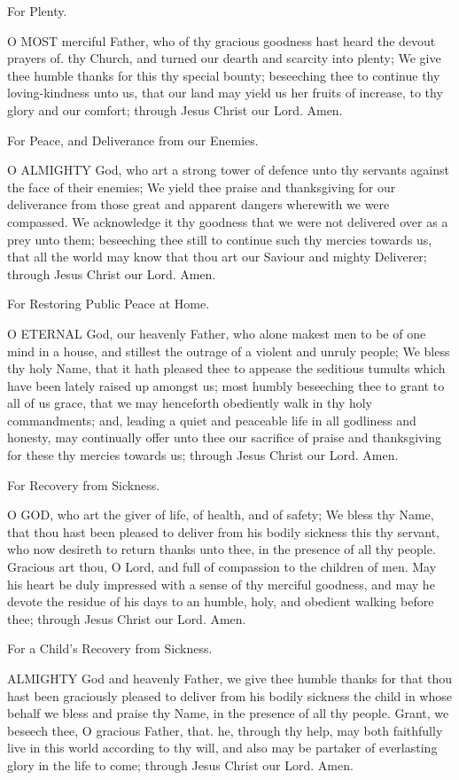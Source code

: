 For Plenty.

O MOST merciful Father, who of thy gracious goodness hast heard the devout prayers of. thy Church, and turned our dearth and scarcity into plenty; We give thee humble thanks for this thy special bounty; beseeching thee to continue thy loving-kindness unto us, that our land may yield us her fruits of increase, to thy glory and our comfort; through Jesus Christ our Lord. Amen.

For Peace, and Deliverance from our Enemies.

O ALMIGHTY God, who art a strong tower of defence unto thy servants against the face of their enemies; We yield thee praise and thanksgiving for our deliverance from those great and apparent dangers wherewith we were compassed. We acknowledge it thy goodness that we were not delivered over as a prey unto them; beseeching thee still to continue such thy mercies towards us, that all the world may know that thou art our Saviour and mighty Deliverer; through Jesus Christ our Lord. Amen.

For Restoring Public Peace at Home.

O ETERNAL God, our heavenly Father, who alone makest men to be of one mind in a house, and stillest the outrage of a violent and unruly people; We bless thy holy Name, that it hath pleased thee to appease the seditious tumults which have been lately raised up amongst us; most humbly beseeching thee to grant to all of us grace, that we may henceforth obediently walk in thy holy commandments; and, leading a quiet and peaceable life in all godliness and honesty, may continually offer unto thee our sacrifice of praise and thanksgiving for these thy mercies towards us; through Jesus Christ our Lord. Amen.

For Recovery from Sickness.

O GOD, who art the giver of life, of health, and of safety; We bless thy Name, that thou hast been pleased to deliver from his bodily sickness this thy servant, who now desireth to return thanks unto thee, in the presence of all thy people. Gracious art thou, O Lord, and full of compassion to the children of men. May his heart be duly impressed with a sense of thy merciful goodness, and may he devote the residue of his days to an humble, holy, and obedient walking before thee; through Jesus Christ our Lord. Amen.

For a Child’s Recovery from Sickness.

ALMIGHTY God and heavenly Father, we give thee humble thanks for that thou hast been graciously pleased to deliver from his bodily sickness the child in whose behalf we bless and praise thy Name, in the presence of all thy people. Grant, we beseech thee, O gracious Father, that. he, through thy help, may both faithfully live in this world according to thy will, and also may be partaker of everlasting glory in the life to come; through Jesus Christ our Lord. Amen.

